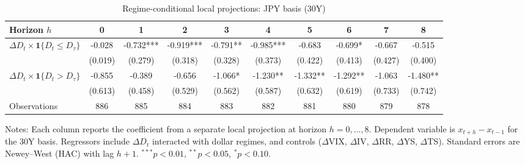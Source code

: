 \begin{table}[!htbp]\centering
\caption{Regime-conditional local projections: JPY basis (30Y)}
\label{tab:lp_jpy_30y}
\begin{tabular}{lccccccccc}
\toprule
Horizon $h$ & 0 & 1 & 2 & 3 & 4 & 5 & 6 & 7 & 8 \\
\midrule
$\Delta D_t \times \mathbf{1}\{D_t \le D_\tau\}$ & -0.028 & -0.732*** & -0.919*** & -0.791** & -0.985*** & -0.683 & -0.699* & -0.667 & -0.515 \\
  & (0.019) & (0.279) & (0.318) & (0.328) & (0.373) & (0.422) & (0.413) & (0.427) & (0.400) \\
$\Delta D_t \times \mathbf{1}\{D_t > D_\tau\}$ & -0.855 & -0.389 & -0.656 & -1.066* & -1.230** & -1.332** & -1.292** & -1.063 & -1.480** \\
  & (0.613) & (0.458) & (0.529) & (0.562) & (0.587) & (0.632) & (0.619) & (0.733) & (0.742) \\
\midrule
Observations & 886 & 885 & 884 & 883 & 882 & 881 & 880 & 879 & 878 \\
\bottomrule
\end{tabular}
\begin{flushleft}\footnotesize Notes: Each column reports the coefficient from a separate local projection at horizon $h=0,\dots,8$. Dependent variable is $x_{t+h}-x_{t-1}$ for the 30Y basis. Regressors include $\Delta D_t$ interacted with dollar regimes, and controls ($\Delta$VIX, $\Delta$IV, $\Delta$RR, $\Delta$YS, $\Delta$TS). Standard errors are Newey--West (HAC) with lag $h+1$. $^{***}p<0.01$, $^{**}p<0.05$, $^{*}p<0.10$.\end{flushleft}
\end{table}